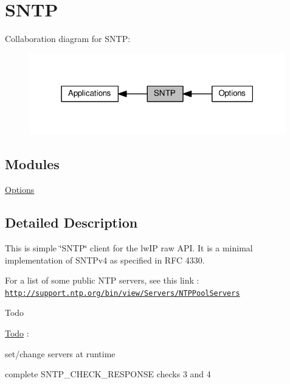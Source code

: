 \hypertarget{group__sntp}{}\section{S\+N\+TP}
\label{group__sntp}
Collaboration diagram for S\+N\+TP\+:
\nopagebreak
\begin{figure}[H]
\begin{center}
\leavevmode
\includegraphics[width=316pt]{group__sntp}
\end{center}
\end{figure}
\subsection*{Modules}
\begin{DoxyCompactItemize}
\item 
\hyperlink{group__sntp__opts}{Options}
\end{DoxyCompactItemize}


\subsection{Detailed Description}
This is simple \char`\"{}\+S\+N\+T\+P\char`\"{} client for the lw\+IP raw A\+PI. It is a minimal implementation of S\+N\+T\+Pv4 as specified in R\+FC 4330.

For a list of some public N\+TP servers, see this link \+: \href{http://support.ntp.org/bin/view/Servers/NTPPoolServers}{\tt http\+://support.\+ntp.\+org/bin/view/\+Servers/\+N\+T\+P\+Pool\+Servers}

\begin{DoxyRefDesc}{Todo}
\item[\hyperlink{todo__todo000004}{Todo}]\+:
\begin{DoxyItemize}
\item set/change servers at runtime
\item complete S\+N\+T\+P\+\_\+\+C\+H\+E\+C\+K\+\_\+\+R\+E\+S\+P\+O\+N\+SE checks 3 and 4 
\end{DoxyItemize}\end{DoxyRefDesc}


